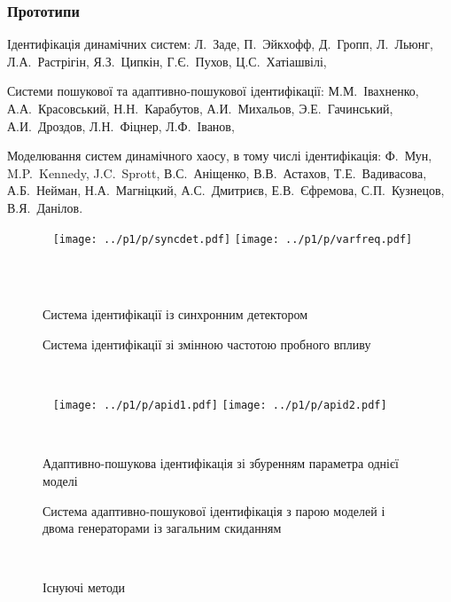 \documentclass[14pt,handout,utf8]{beamer}
\newlength\TW
\newcommand{\Xhead}[1]{
 \begin{center}%
      \textbf{#1}%
 \end{center}%
}
\begin{document}
\begin{frame}
  \frametitle{Прототипи}

  \Xhead{}

  Ідентифікація динамічних систем:
  Л.~Заде,
  П.~Эйкхофф,
  Д.~Гропп,
  Л.~Льюнг,
  Л.А.~Растрігін,
  Я.З.~Ципкін,
  Г.Є.~Пухов,
  Ц.С.~Хатіашвілі,

  \vfill


Системи пошукової та адаптивно-пошукової ідентифікації:
  М.М.~Івахненко,
  А.А.~Красовський,
  Н.Н.~Карабутов,
  А.И.~Михальов,
  Э.Е.~Гачинський,
  А.И.~Дроздов,
  Л.Н.~Фіцнер,
  Л.Ф.~Іванов,

  \vfill

Моделювання систем динамічного хаосу, в тому числі ідентифікація:
  Ф.~Мун,
  M.P.~Kennedy,
  J.C.~Sprott,
  В.С.~Аніщенко,
  В.В.~Астахов,
  Т.Е.~Вадивасова,
  А.Б.~Нейман,
  Н.А.~Магніцкий,
  А.С.~Дмитриєв,
  Е.В.~Єфремова,
  С.П.~Кузнецов,
  В.Я.~Данілов.

  \begin{figure}
    \begin{center}
      ~ \hfill
      \texttt{[image: ../p1/p/syncdet.pdf]}
      \hfill
      \texttt{[image: ../p1/p/varfreq.pdf]}
      \hfill ~
    \end{center}
    \begin{center}
      ~ \hfill
      \parbox[t]{48\TW}{\centering Система ідентифікації із синхронним детектором}
      \hfill
      \parbox[t]{48\TW}{\centering Система ідентифікації зі змінною частотою пробного впливу}
      \hfill ~
    \end{center}
    \begin{center}
      ~ \hfill
      \texttt{[image: ../p1/p/apid1.pdf]}
      \hfill
      \texttt{[image: ../p1/p/apid2.pdf]}
      \hfill ~
    \end{center}
    \begin{center}
      ~ \hfill
      \parbox[t]{48\TW}{\centering Адаптивно-пошукова ідентифікація зі збуренням параметра однієї моделі}
      \hfill
      \parbox[t]{48\TW}{\centering Система адаптивно-пошукової ідентифікація з парою моделей і двома генераторами із загальним скиданням}
      \hfill ~
    \end{center}
    \label{atu:f:oldsch}
    \caption{Існуючі методи}
  \end{figure}



\end{frame}
\end{document}
